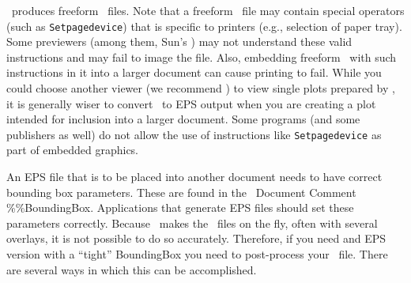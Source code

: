 \GMT\ produces freeform \PS\ files. Note that a freeform \PS\ file may contain special operators (such as \texttt{Setpagedevice}) that is specific to printers (e.g., selection of paper tray). Some previewers (among them, Sun's ) may not understand these valid instructions and may fail to image the file. Also, embedding freeform \PS\ with such instructions in it into a larger document can cause printing to fail. While you could choose another viewer (we recommend ) to view single plots prepared by \GMT, it is generally wiser to convert \PS\ to EPS output when you are creating a plot intended for inclusion into a larger document. Some programs (and some publishers as well) do not allow the use of instructions like \texttt{Setpagedevice} as part of embedded graphics.

An EPS file that is to be placed into another document needs to have correct bounding box parameters.  These are found in the \PS\ Document Comment \%\%BoundingBox.  Applications that generate EPS files should set these parameters correctly.  Because \GMT\
makes the \PS\ files on the fly, often with several overlays, it is not possible to do so accurately.  Therefore, if you need and EPS version with a ``tight'' BoundingBox you need to post-process your \PS\ file.  There are several ways in which this can be accomplished.


